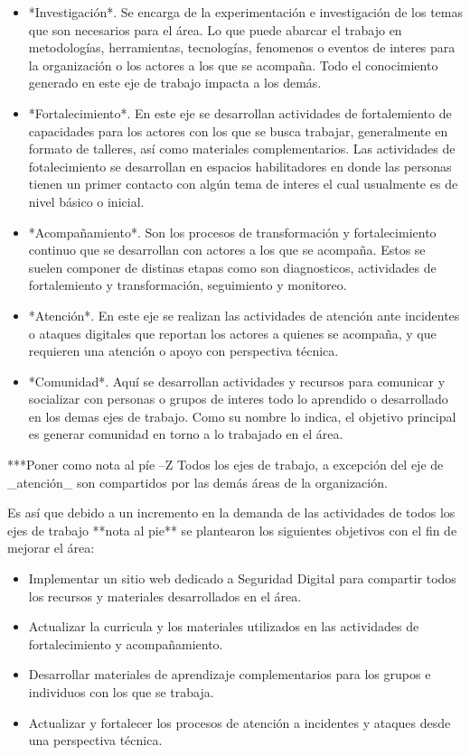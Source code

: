 \documentclass[12pt]{caltech_thesis}
\begin{document}
\begin{itemize}
    \item *Investigación*. Se encarga de la experimentación e investigación de los temas que son necesarios para el área. Lo que puede abarcar el trabajo en metodologías, herramientas, tecnologías, fenomenos o eventos de interes para la organización o los actores a los que se acompaña. Todo el conocimiento generado en este eje de trabajo impacta a los demás.
    \item *Fortalecimiento*. En este eje se desarrollan actividades de fortalemiento de capacidades para los actores con los que se busca trabajar, generalmente en formato de talleres, así como materiales complementarios. Las actividades de fotalecimiento se desarrollan en espacios habilitadores en donde las personas tienen un primer contacto con algún tema de interes el cual usualmente es de nivel básico o inicial.
    \item *Acompañamiento*. Son los procesos de transformación y fortalecimiento continuo que se desarrollan con actores a los que se acompaña. Estos se suelen componer de distinas etapas como son diagnosticos, actividades de fortalemiento y transformación, seguimiento y monitoreo. 
    \item *Atención*. En este eje se realizan las actividades de atención ante incidentes o ataques digitales que reportan los actores a quienes se acompaña, y que requieren una atención o apoyo con perspectiva técnica.
    \item *Comunidad*. Aquí se desarrollan actividades y recursos para comunicar y socializar con personas o grupos de interes todo lo aprendido o desarrollado en los demas ejes de trabajo. Como su nombre lo indica, el objetivo principal es generar comunidad en torno a lo trabajado en el área. 
\end{itemize}

***Poner como nota al píe --Z Todos los ejes de trabajo, a excepción del eje de _atención_ son compartidos por las demás áreas de la organización.

Es así que debido a un incremento en la demanda de las actividades de todos los ejes de trabajo **nota al pie** se plantearon los siguientes objetivos con el fin de mejorar el área:

\begin{itemize}
    \item Implementar un sitio web dedicado a Seguridad Digital para compartir todos los recursos y materiales desarrollados en el área.
    \item Actualizar la curricula y los materiales utilizados en las actividades de fortalecimiento y acompañamiento.
    \item Desarrollar materiales de aprendizaje complementarios para los grupos e individuos con los que se trabaja. 
    \item Actualizar y fortalecer los procesos de atención a incidentes y ataques desde una perspectiva técnica.
\end{itemize}
\end{document}
